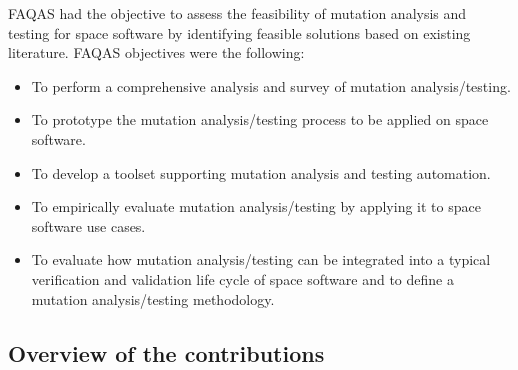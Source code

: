 FAQAS had the objective to assess the feasibility of mutation analysis and testing for space software by identifying feasible solutions based on existing literature. FAQAS objectives were the following:
\begin{itemize}
\item To perform a comprehensive analysis and survey of mutation analysis/testing.
\item To prototype the mutation analysis/testing process to be applied on space software.
\item To develop a toolset supporting mutation analysis and testing automation.
\item To empirically evaluate mutation analysis/testing by applying it to space software use cases.
\item To evaluate how mutation analysis/testing can be integrated into a typical verification and validation life cycle of space software and to define a mutation analysis/testing methodology.
\end{itemize}


\subsection*{Overview of the contributions}


